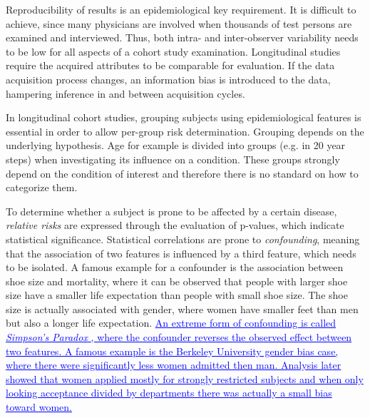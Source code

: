 \documentclass[journal]{style/vgtc} 			          %
\newcommand{\add}[1]{\textcolor{blue}{\uline{#1}}}
\begin{document}
Reproducibility of results is an epidemiological key requirement.
%
It is difficult to achieve, since many physicians are involved when thousands of test persons are examined and interviewed.
%
Thus, both intra- and inter-observer variability needs to be low for all aspects of a cohort study examination.
%
Longitudinal studies require the acquired attributes to be comparable for evaluation.
%
If the data acquisition process changes, an information bias is introduced to the data, hampering inference in and between acquisition cycles.
%

In longitudinal cohort studies, grouping subjects using epidemiological features is essential in order to allow per-group risk determination.
%
Grouping depends on the underlying hypothesis.
%
Age for example is divided into groups (e.g. in 20 year steps) when investigating its influence on a condition.
%
These groups strongly depend on the condition of interest and therefore there is no standard on how to categorize them.

To determine whether a subject is prone to be affected by a certain disease, \emph{relative risks} are expressed through the evaluation of p-values, which indicate statistical significance.
%
Statistical correlations are prone to \emph{confounding}, meaning that the association of two features is influenced by a third feature, which needs to be isolated.
%
A famous example for a confounder is the association between shoe size and mortality, where it can be observed that people with larger shoe size have a smaller life expectation than people with small shoe size.
%
The shoe size is actually associated with gender, where women have smaller feet than men but also a longer life expectation.
%
\add{An extreme form of confounding is called \emph{Simpson's Paradox} \cite{SimpsonsParadox}, where the confounder reverses the observed effect between two features.
%
A famous example is the Berkeley University gender bias case, where there were significantly less women admitted then man.
%
Analysis later showed that women applied mostly for strongly restricted subjects and when only looking acceptance divided by departments there was actually a small bias toward women.
%
}
\end{document}
